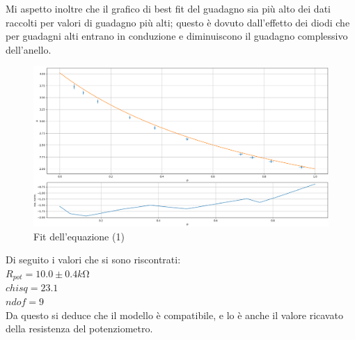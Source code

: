\documentclass[10pt, a4paper, italian]{article}
\begin{document}
Mi aspetto inoltre che il grafico di best fit del guadagno sia più alto dei dati raccolti per valori di guadagno più alti; questo è dovuto dall'effetto dei diodi che per guadagni alti entrano in conduzione e diminuiscono il guadagno complessivo dell'anello.
\begin{figure}[H]
    \centering
	\includegraphics[scale=0.4]{arinzarunza}
    \caption{Fit dell'equazione (1)
    \label{fig: Draft1}}
\end{figure}
Di seguito i valori che si sono riscontrati:\\
$R_{pot}=10.0 \pm 0.4 \si{k\ohm}$\\$chisq=23.1$\\$ndof=9$\\
Da questo si deduce che il modello è compatibile, e lo è anche il valore ricavato della resistenza del potenziometro. 
\end{document}
